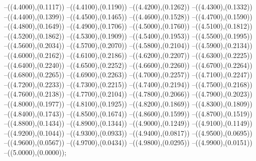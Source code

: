 {	--({\sx*(4.4000)},{\sy*(0.1117)})
	--({\sx*(4.4100)},{\sy*(0.1190)})
	--({\sx*(4.4200)},{\sy*(0.1262)})
	--({\sx*(4.4300)},{\sy*(0.1332)})
	--({\sx*(4.4400)},{\sy*(0.1399)})
	--({\sx*(4.4500)},{\sy*(0.1465)})
	--({\sx*(4.4600)},{\sy*(0.1528)})
	--({\sx*(4.4700)},{\sy*(0.1590)})
	--({\sx*(4.4800)},{\sy*(0.1649)})
	--({\sx*(4.4900)},{\sy*(0.1706)})
	--({\sx*(4.5000)},{\sy*(0.1760)})
	--({\sx*(4.5100)},{\sy*(0.1812)})
	--({\sx*(4.5200)},{\sy*(0.1862)})
	--({\sx*(4.5300)},{\sy*(0.1909)})
	--({\sx*(4.5400)},{\sy*(0.1953)})
	--({\sx*(4.5500)},{\sy*(0.1995)})
	--({\sx*(4.5600)},{\sy*(0.2034)})
	--({\sx*(4.5700)},{\sy*(0.2070)})
	--({\sx*(4.5800)},{\sy*(0.2104)})
	--({\sx*(4.5900)},{\sy*(0.2134)})
	--({\sx*(4.6000)},{\sy*(0.2162)})
	--({\sx*(4.6100)},{\sy*(0.2186)})
	--({\sx*(4.6200)},{\sy*(0.2207)})
	--({\sx*(4.6300)},{\sy*(0.2225)})
	--({\sx*(4.6400)},{\sy*(0.2240)})
	--({\sx*(4.6500)},{\sy*(0.2252)})
	--({\sx*(4.6600)},{\sy*(0.2260)})
	--({\sx*(4.6700)},{\sy*(0.2264)})
	--({\sx*(4.6800)},{\sy*(0.2265)})
	--({\sx*(4.6900)},{\sy*(0.2263)})
	--({\sx*(4.7000)},{\sy*(0.2257)})
	--({\sx*(4.7100)},{\sy*(0.2247)})
	--({\sx*(4.7200)},{\sy*(0.2233)})
	--({\sx*(4.7300)},{\sy*(0.2215)})
	--({\sx*(4.7400)},{\sy*(0.2194)})
	--({\sx*(4.7500)},{\sy*(0.2168)})
	--({\sx*(4.7600)},{\sy*(0.2138)})
	--({\sx*(4.7700)},{\sy*(0.2104)})
	--({\sx*(4.7800)},{\sy*(0.2066)})
	--({\sx*(4.7900)},{\sy*(0.2023)})
	--({\sx*(4.8000)},{\sy*(0.1977)})
	--({\sx*(4.8100)},{\sy*(0.1925)})
	--({\sx*(4.8200)},{\sy*(0.1869)})
	--({\sx*(4.8300)},{\sy*(0.1809)})
	--({\sx*(4.8400)},{\sy*(0.1743)})
	--({\sx*(4.8500)},{\sy*(0.1674)})
	--({\sx*(4.8600)},{\sy*(0.1599)})
	--({\sx*(4.8700)},{\sy*(0.1519)})
	--({\sx*(4.8800)},{\sy*(0.1434)})
	--({\sx*(4.8900)},{\sy*(0.1344)})
	--({\sx*(4.9000)},{\sy*(0.1249)})
	--({\sx*(4.9100)},{\sy*(0.1149)})
	--({\sx*(4.9200)},{\sy*(0.1044)})
	--({\sx*(4.9300)},{\sy*(0.0933)})
	--({\sx*(4.9400)},{\sy*(0.0817)})
	--({\sx*(4.9500)},{\sy*(0.0695)})
	--({\sx*(4.9600)},{\sy*(0.0567)})
	--({\sx*(4.9700)},{\sy*(0.0434)})
	--({\sx*(4.9800)},{\sy*(0.0295)})
	--({\sx*(4.9900)},{\sy*(0.0151)})
	--({\sx*(5.0000)},{\sy*(0.0000)});
}
